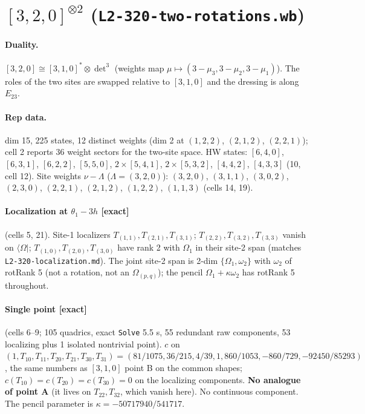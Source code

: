\documentclass[11pt]{article}
\newcommand{\bra}[1]{\langle #1|}
\newcommand{\Om}{\Omega}
\newcommand{\Tt}[1]{T_{#1}}
\newcommand{\ex}{\textbf{[exact]}}
\newcommand{\nb}[1]{\texttt{#1}}
\begin{document}
\section{$[3,2,0]^{\otimes2}$ (\nb{L2-320-two-rotations.wb})}\label{sec:320}

\paragraph{Duality.} $[3,2,0]\cong[3,1,0]^*\otimes\det^3$ (weights map $\mu\mapsto(3-\mu_3,3-\mu_2,3-\mu_1)$). The roles of the two sites are swapped relative to $[3,1,0]$ and the dressing is along $E_{23}$.

\paragraph{Rep data.} dim 15, 225 states, 12 distinct weights (dim 2 at $(1,2,2)$, $(2,1,2)$, $(2,2,1)$); cell 2 reports 36 weight sectors for the two-site space. HW states: $[6,4,0]$, $[6,3,1]$, $[6,2,2]$, $[5,5,0]$, $2\times[5,4,1]$, $2\times[5,3,2]$, $[4,4,2]$, $[4,3,3]$ (10, cell 12). Site weights $\nu-\Lambda$ ($\Lambda=(3,2,0)$): $(3,2,0)$, $(3,1,1)$, $(3,0,2)$, $(2,3,0)$, $(2,2,1)$, $(2,1,2)$, $(1,2,2)$, $(1,1,3)$ (cells 14, 19).

\paragraph{Localization at $\theta_1-3h$ \ex} (cells 5, 21). Site-1 localizers $\Tt{(1,1)},\Tt{(2,1)},\Tt{(3,1)}$; $\Tt{(2,2)},\Tt{(3,2)},\Tt{(3,3)}$ vanish on $\bra\Om$; $\Tt{(1,0)},\Tt{(2,0)},\Tt{(3,0)}$ have rank 2 with $\Om_1$ in their site-2 span (matches \nb{L2-320-localization.md}). The joint site-2 span is 2-dim $\{\Om_1,\omega_2\}$ with $\omega_2$ of rotRank 5 (not a rotation, not an $\Om_{(p,q)}$); the pencil $\Om_1+\kappa\omega_2$ has rotRank 5 throughout.

\paragraph{Single point \ex} (cells 6--9; 105 quadrics, exact \texttt{Solve} 5.5 s, 55 redundant raw components, 53 localizing plus 1 isolated nontrivial point). $c$ on $(1,\Tt{10},\Tt{11},\Tt{20},\Tt{21},\Tt{30},\Tt{31})=(81/1075,36/215,4/39,1,860/1053,-860/729,-92450/85293)$, the same numbers as $[3,1,0]$ point B on the common shapes; $c(\Tt{10})=c(\Tt{20})=c(\Tt{30})=0$ on the localizing components. \textbf{No analogue of point A} (it lives on $\Tt{22},\Tt{32}$, which vanish here). No continuous component. The pencil parameter is $\kappa=-50717940/541717$.
\end{document}
